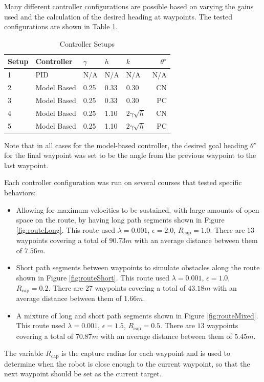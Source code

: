 Many different controller configurations are possible based on varying the gains used and the calculation of the desired heading at waypoints. The tested configurations are shown in Table \ref{tab:resultsControllersSetup}.

\begin{table}[ht!]
\caption{Controller Setups}
\small
\centering
\begin{tabular}{@{}lllllr@{}} \toprule
Setup & Controller  & $\gamma$ & $h$  & $k$               & $\theta^\star$ \\ \midrule
1     & PID         & N/A      & N/A  & N/A               & N/A \\
2     & Model Based & 0.25     & 0.33 & 0.30              & CN \\
3     & Model Based & 0.25     & 0.33 & 0.30              & PC \\
4     & Model Based & 0.25     & 1.10 & $2\gamma\sqrt{h}$ & CN \\
5     & Model Based & 0.25     & 1.10 & $2\gamma\sqrt{h}$ & PC \\ \bottomrule
\end{tabular}
\label{tab:resultsControllersSetup}
\end{table}

Note that in all cases for the model-based controller, the desired goal heading $\theta^\star$ for the final waypoint was set to be the angle from the previous waypoint to the last waypoint.

Each controller configuration was run on several courses that tested specific behaviors:
\begin{itemize}
\item Allowing for maximum velocities to be sustained, with large amounts of open space on the route, by having long path segments shown in Figure \ref{fig:routeLong}. This route used $\lambda = 0.001$, $\epsilon = 2.0$, $R_{\text{cap}} = 1.0$. There are $13$ waypoints covering a total of $90.73 m$ with an average distance between them of $7.56 m$.
\item Short path segments between waypoints to simulate obstacles along the route shown in Figure \ref{fig:routeShort}. This route used $\lambda = 0.001$, $\epsilon = 1.0$, $R_{\text{cap}} = 0.2$. There are $27$ waypoints covering a total of $43.18 m$ with an average distance between them of $1.66 m$.
\item A mixture of long and short path segments shown in Figure \ref{fig:routeMixed}. This route used $\lambda = 0.001$, $\epsilon = 1.5$, $R_{\text{cap}} = 0.5$. There are $13$ waypoints covering a total of $70.87 m$ with an average distance between them of $5.45 m$.
\end{itemize}
The variable $R_{\text{cap}}$ is the capture radius for each waypoint and is used to determine when the robot is close enough to the current waypoint, so that the next waypoint should be set as the current target.


